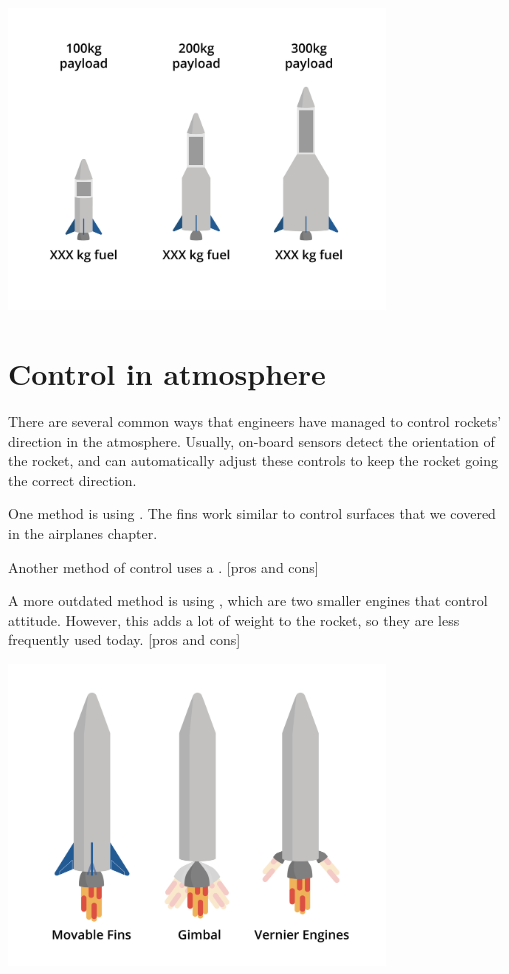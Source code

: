 \includegraphics[width=0.75\textwidth]{rocketFuelWeight.png}


\section{Control in atmosphere}

There are several common ways that engineers have managed to control rockets' direction in the atmosphere. Usually, on-board sensors detect the orientation of the rocket, and can automatically adjust these controls to keep the rocket going the correct direction.

	
	One method is using . The fins work similar to control surfaces that we covered in the airplanes chapter. 



	Another method of control uses a . [pros and cons]
	
	A more outdated method is using , which are two smaller engines that control attitude. However, this adds a lot of weight to the rocket, so they are less frequently used today. [pros and cons]


\includegraphics[width=0.75\textwidth]{control.png}


